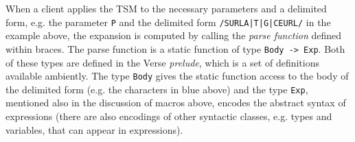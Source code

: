 When a client applies the TSM to the necessary parameters and a delimited form, e.g. the parameter \lstinline{P} and the delimited form \lstinline{/SURLA|T|G|CEURL/} in the example above, the expansion is computed by calling the \emph{parse function} defined within braces. The parse function is a static function of type \lstinline{Body -> Exp}. Both of these types are defined in the Verse \emph{prelude}, which is a set of definitions available ambiently. The type \lstinline{Body} gives the static function access to the {body} of the delimited form (e.g. the characters in blue above) and the type \lstinline{Exp}, mentioned also in the discussion of macros above,  encodes the abstract syntax of expressions (there are also encodings of other syntactic classes, e.g. types and variables, that can appear in expressions). %

